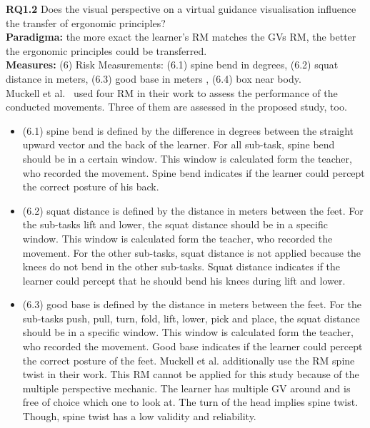 \textbf{RQ1.2} Does the visual perspective on a virtual guidance visualisation influence the transfer of ergonomic principles?\\
\textbf{Paradigma:} the more exact the learner's RM matches the GVs RM, the better the ergonomic principles could be transferred.\\
\textbf{Measures:} (6) Risk Measurements: (6.1) spine bend in degrees, (6.2) squat distance in meters, (6.3) good base in meters , (6.4) box near body.\\
Muckell et al.~\cite{muckell} used four RM in their work to assess the performance of the conducted movements. Three of them are assessed in the proposed study, too.
\begin{itemize}
	\item[] (6.1) spine bend is defined by the difference in degrees between the straight upward vector and the back of the learner. For all sub-task, spine bend should be in a certain window. This window is calculated form the teacher, who recorded the movement. Spine bend indicates if the learner could percept the correct posture of his back.
	
	\item[] (6.2) squat distance is defined by the distance in meters between the feet. For the sub-tasks lift and lower, the squat distance should be in a specific window. This window is calculated form the teacher, who recorded the movement. For the other sub-tasks, squat distance is not applied because the knees do not bend in the other sub-tasks. Squat distance indicates if the learner could percept that he should bend his knees during lift and lower.
	
	\item[] (6.3) good base is defined by the distance in meters between the feet. For the sub-tasks push, pull, turn, fold, lift, lower, pick and place, the squat distance should be in a specific window. This window is calculated form the teacher, who recorded the movement. Good base indicates if the learner could percept the correct posture of the feet.
	Muckell et al.\cite{muckell} additionally use the RM spine twist in their work. This RM cannot be applied for this study because of the multiple perspective mechanic. The learner has multiple GV around and is free of choice which one to look at. The turn of the head implies spine twist. Though, spine twist has a low validity and reliability.
	

\end{itemize}
